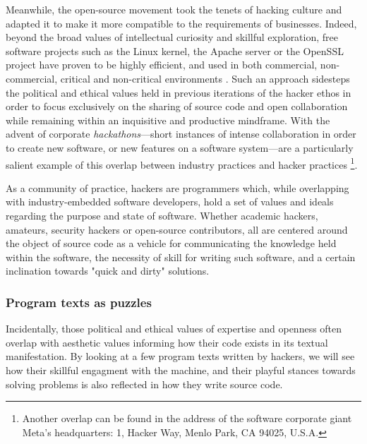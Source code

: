 Meanwhile, the open-source movement took the tenets of hacking culture and adapted it to make it more compatible to the requirements of businesses. Indeed, beyond the broad values of intellectual curiosity and skillful exploration, free software projects such as the Linux kernel, the Apache server or the OpenSSL project have proven to be highly efficient, and used in both commercial, non-commercial, critical and non-critical environments \citep{raymond_cathedral_2001}. Such an approach sidesteps the political and ethical values held in previous iterations of the hacker ethos in order to focus exclusively on the sharing of source code and open collaboration while remaining within an inquisitive and productive mindframe. With the advent of corporate \emph{hackathons}—short instances of intense collaboration in order to create new software, or new features on a software system—are a particularly salient example of this overlap between industry practices and hacker practices \citep{nolte_you_2018}\footnote{Another overlap can be found in the address of the software corporate giant Meta's headquarters: 1, Hacker Way, Menlo Park, CA 94025, U.S.A.}.

As a community of practice, hackers are programmers which, while overlapping with industry-embedded software developers, hold a set of values and ideals regarding the purpose and state of software. Whether academic hackers, amateurs, security hackers or open-source contributors, all are centered around the object of source code as a vehicle for communicating the knowledge held within the software, the necessity of skill for writing such software, and a certain inclination towards "quick and dirty" solutions.

\subsubsection{Program texts as puzzles}
\label{subsubsec:program-texts-puzzles}

Incidentally, those political and ethical values of expertise and openness often overlap with aesthetic values informing how their code exists in its textual manifestation. By looking at a few program texts written by hackers, we will see how their skillful engagment with the machine, and their playful stances towards solving problems is also reflected in how they write source code.

